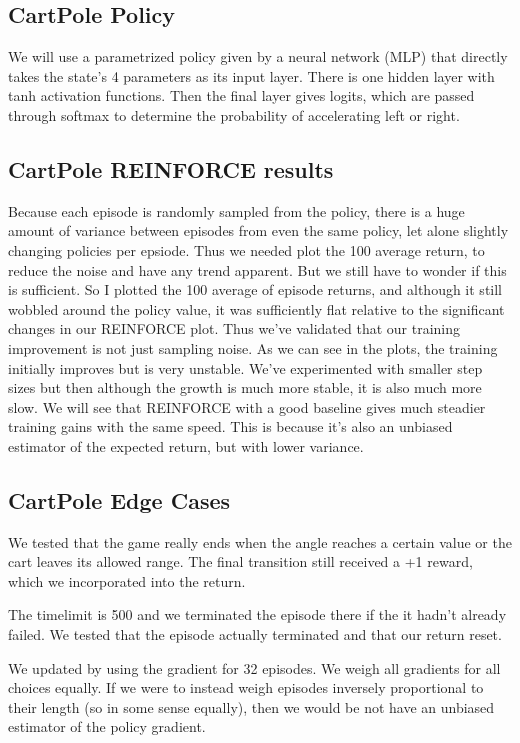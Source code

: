 \documentclass{article}
\begin{document}
\subsection{CartPole Policy}
We will use a parametrized policy given by a neural network (MLP) that directly takes the state's 4 parameters as its input layer. There is one hidden layer with tanh activation functions. Then the final layer gives logits, which are passed through softmax to determine the probability of accelerating left or right.

\subsection{CartPole REINFORCE results}
Because each episode is randomly sampled from the policy, there is a huge amount of variance between episodes from even the same policy, let alone slightly changing policies per epsiode. Thus we needed plot the 100 average return, to reduce the noise and have any trend apparent. But we still have to wonder if this is sufficient. So I plotted the 100 average of episode returns, and although it still wobbled around the policy value, it was sufficiently flat relative to the significant changes in our REINFORCE plot. Thus we've validated that our training improvement is not just sampling noise.
As we can see in the plots, the training initially improves but is very unstable. We've experimented with smaller step sizes but then although the growth is much more stable, it is also much more slow. We will see that REINFORCE with a good baseline gives much steadier training gains with the same speed. This is because it's also an unbiased estimator of the expected return, but with lower variance.

\subsection{CartPole Edge Cases}
We tested that the game really ends when the angle reaches a certain value or the cart leaves its allowed range. The final transition still received a +1 reward, which we incorporated into the return.

The timelimit is 500 and we terminated the episode there if the it hadn't already failed. We tested that the episode actually terminated and that our return reset. 

We updated by using the gradient for 32 episodes. We weigh all gradients for all choices equally. If we were to instead weigh episodes inversely proportional to their length (so in some sense equally), then we would be not have an unbiased estimator of the policy gradient.
\end{document}
